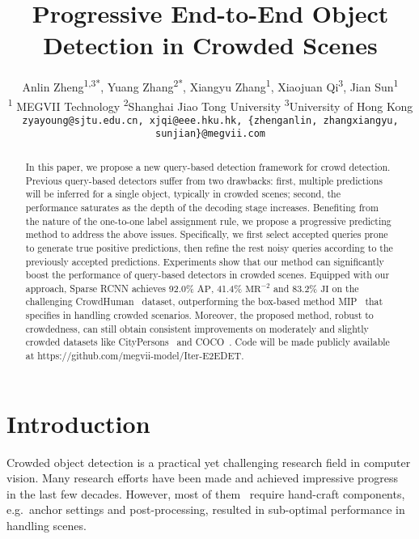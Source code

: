 \documentclass[final]{cvpr}
\author{\Large 
Anlin Zheng\textsuperscript{\rm 1,3*},
Yuang Zhang\textsuperscript{\rm 2*},
Xiangyu Zhang\textsuperscript{\rm 1},
Xiaojuan Qi\textsuperscript{\rm 3},
Jian Sun\textsuperscript{\rm 1}\\
\textsuperscript{\rm 1} MEGVII Technology \quad
\textsuperscript{\rm 2}Shanghai Jiao Tong University\quad
\textsuperscript{\rm 3}{University of Hong Kong}
\\
\texttt{\small zyayoung@sjtu.edu.cn, xjqi@eee.hku.hk, \{zhenganlin, zhangxiangyu, sunjian\}@megvii.com}\\
}
\begin{document}
\title{Progressive End-to-End Object Detection in Crowded Scenes}




\maketitle

{\let\thefootnote\relax{}}


\begin{abstract}
In this paper, we propose a new query-based detection framework for crowd detection. Previous query-based detectors suffer from two drawbacks: first, multiple predictions will be inferred for a single object, typically in crowded scenes; second, the performance saturates as the depth of the decoding stage increases. Benefiting from the nature of the one-to-one label assignment rule, we propose a progressive predicting method to address the above issues. Specifically, we first select accepted queries prone to generate true positive predictions, then refine the rest noisy queries according to the previously accepted predictions. Experiments show that our method can significantly boost the performance of query-based detectors in crowded scenes. Equipped with our approach, Sparse RCNN achieves 92.0\% $\text{AP}$, 41.4\% $\text{MR}^{-2}$ and 83.2\% $\text{JI}$ on the challenging CrowdHuman~\cite{shao2018crowdhuman} dataset, outperforming the box-based method MIP~\cite{chu2020detection} that specifies in handling crowded scenarios. Moreover, the proposed method, robust to crowdedness, can still obtain consistent improvements on moderately and slightly crowded datasets like CityPersons~\cite{zhang2017citypersons} and COCO~\cite{lin2014microsoft}. Code will be made publicly available at https://github.com/megvii-model/Iter-E2EDET.







\vspace{-2pt}
\end{abstract}

\section{Introduction}\label{intro}
Crowded object detection is a practical yet challenging research field in computer vision. Many research efforts have been made and achieved impressive progress ~\cite{lu2019semantic, chi2020pedhunter, chi2020relational,zhang2019double,zhang2018occlusion,chu2020detection,iterdet2021,psrcnn,lin2020detr} in the last few decades. However, most of them~\cite{lu2019semantic, chi2020pedhunter, chi2020relational,zhang2019double,zhang2018occlusion,chu2020detection,iterdet2021,psrcnn} require hand-craft components, e.g.\ anchor settings and post-processing, resulted in sub-optimal performance in handling scenes.
\end{document}
